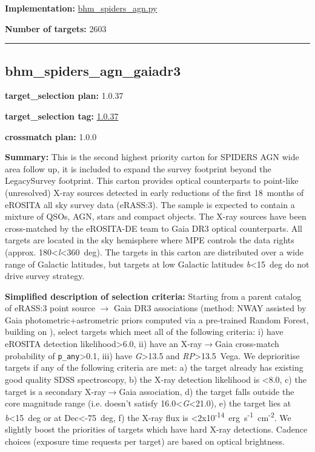 \noindent\textbf{Implementation:}
\href{https://github.com/sdss/target_selection/blob/1.0.37/python/target_selection/cartons/bhm_spiders_agn.py}{bhm\_spiders\_agn.py}

\noindent\textbf{Number of targets:} 2603

\begin{center}\rule{0.5\linewidth}{0.5pt}\end{center}

\hypertarget{bhm_spiders_agn_gaiadr3_plan1.0.37}{%
\subsection{bhm\_spiders\_agn\_gaiadr3}\label{bhm_spiders_agn_gaiadr3_plan1.0.37}}

\noindent\textbf{target\_selection plan:} 1.0.37

\noindent\textbf{target\_selection tag:}
\href{https://github.com/sdss/target_selection/tree/1.0.37/}{1.0.37}

\noindent\textbf{crossmatch plan:} 1.0.0

\noindent\textbf{Summary:} This is the second highest priority carton for SPIDERS
AGN wide area follow up, it is included to expand the survey footprint
beyond the LegacySurvey footprint. This carton provides optical
counterparts to point-like (unresolved) X-ray sources detected in early
reductions of the first 18~months of eROSITA all sky survey data
(eRASS:3). The sample is expected to contain a mixture of QSOs, AGN,
stars and compact objects. The X-ray sources have been cross-matched by
the eROSITA-DE team to Gaia DR3 optical counterparts. All targets are
located in the sky hemisphere where MPE controls the data rights
(approx. 180\textless{}\emph{l}\textless360~deg). The targets in this
carton are distributed over a wide range of Galactic latitudes, but
targets at low Galactic latitudes
\textbar{}\emph{b}\textbar\textless15~deg do not drive survey strategy.

\noindent\textbf{Simplified description of selection criteria:} Starting from a
parent catalog of eRASS:3 point source $\rightarrow$ Gaia DR3 associations (method:
NWAY assisted by Gaia photometric+astrometric priors computed via a
pre-trained Random Forest, building on
\citealt{Salvato2022}), select targets which meet all of the following criteria:
i) have eROSITA detection likelihood\textgreater6.0, ii) have an
X-ray$\rightarrow$Gaia cross-match probability of \texttt{p\_any}\textgreater0.1,
iii) have \emph{G}\textgreater13.5 and \emph{RP}\textgreater13.5~Vega.
We deprioritise targets if any of the following criteria are met: a) the
target already has existing good quality SDSS spectroscopy, b) the X-ray
detection likelihood is \textless8.0, c) the target is a secondary
X-ray$\rightarrow$Gaia association, d) the target falls outside the core magnitude
range (i.e. doesn't satisfy 16.0\textless{}\emph{G}\textless21.0), e)
the target lies at \textbar{}\emph{b}\textbar\textless15~deg or at
Dec\textless-75~deg, f) the X-ray flux is
\textless2x10\textsuperscript{-14}~erg~s\textsuperscript{-1}~cm\textsuperscript{-2}.
We slightly boost the priorities of targets which have hard X-ray
detections. Cadence choices (exposure time requests per target) are
based on optical brightness.


